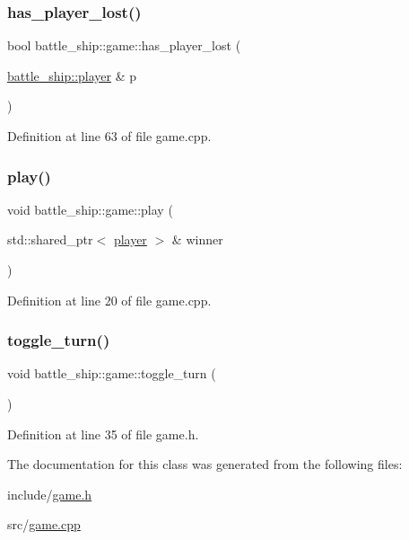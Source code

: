 \subsubsection{\texorpdfstring{has\+\_\+player\+\_\+lost()}{has\_player\_lost()}}
{\footnotesize\ttfamily bool battle\+\_\+ship\+::game\+::has\+\_\+player\+\_\+lost (\begin{DoxyParamCaption}\item[{\hyperlink{classbattle__ship_1_1player}{battle\+\_\+ship\+::player} \&}]{p }\end{DoxyParamCaption})}



Definition at line 63 of file game.\+cpp.

\mbox{\label{classbattle__ship_1_1game_a8bd311ac1aaab0a16c06b4f1b9664af4}} 
\subsubsection{\texorpdfstring{play()}{play()}}
{\footnotesize\ttfamily void battle\+\_\+ship\+::game\+::play (\begin{DoxyParamCaption}\item[{std\+::shared\+\_\+ptr$<$ \hyperlink{classbattle__ship_1_1player}{player} $>$ \&}]{winner }\end{DoxyParamCaption})}



Definition at line 20 of file game.\+cpp.

\mbox{\label{classbattle__ship_1_1game_a0e5a85f6c1f0cff5e1104545b5222026}} 
\subsubsection{\texorpdfstring{toggle\+\_\+turn()}{toggle\_turn()}}
{\footnotesize\ttfamily void battle\+\_\+ship\+::game\+::toggle\+\_\+turn (\begin{DoxyParamCaption}{ }\end{DoxyParamCaption})\hspace{0.3cm}{\ttfamily [inline]}}



Definition at line 35 of file game.\+h.



The documentation for this class was generated from the following files\+:\begin{DoxyCompactItemize}
\item 
include/\hyperlink{game_8h}{game.\+h}\item 
src/\hyperlink{game_8cpp}{game.\+cpp}\end{DoxyCompactItemize}
